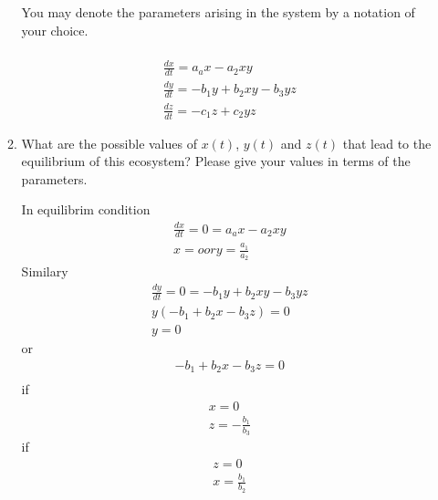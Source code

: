 \documentclass[12pt]{article}
\begin{document}
\begin{enumerate}[{\bf I.}]
\begin{enumerate}
   You may denote the parameters arising in the system by a notation of your choice.
   \\\\
    \begin{align}
    \frac{dx}{dt} = a_ax - a_2xy \\
    \frac{dy}{dt} = -b_1y + b_2xy -b_3yz \\
    \frac{dz}{dt} = -c_1z + c_2 yz
    \end{align} 
  \item What are the possible values of $x(t)$, $y(t)$ and $z(t)$ that lead to the equilibrium of this ecosystem? Please give your values in terms of the parameters.
  
  In equilibrim condition
  \begin{align}
  \nonumber
  \frac{dx}{dt} = 0 = a_ax - a_2xy\\
  \nonumber
  x = o or y = \frac{a_1}{a_2}
  \end{align}
  Similary
  \begin{align}
  \nonumber
  \frac{dy}{dt} = 0 = -b_1y + b_2xy -b_3yz \\
  \nonumber
  y(-b_1 + b_2x - b_3z) = 0\\
  \nonumber
  y = 0 
  \end{align}
  or
  \begin{align}
  \nonumber
  -b_1 +b_2x -b_3z =0\\
  \end{align}
  if 
  \begin{align}
  \nonumber
  x = 0\\
  \nonumber
  z = -\frac{b_1}{b_3}
  \end{align}
  if 
  \begin{align}
  \nonumber
  z = 0\\
  \nonumber
  x = \frac{b_1}{b_2}
  \end{align}
  

\end{enumerate}
\end{enumerate}
\end{document}
